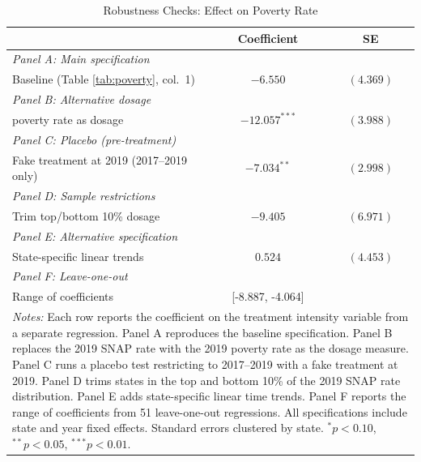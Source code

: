 \begin{table}[htbp]
\centering
\caption{Robustness Checks: Effect on Poverty Rate}
\label{tab:robustness}
\begin{tabular}{lcc}
\hline\hline
 & Coefficient & SE \\
\hline
\textit{Panel A: Main specification} & & \\
\quad Baseline (Table \ref{tab:poverty}, col.~1) & $-6.550$ & $(4.369)$ \\
[6pt]
\textit{Panel B: Alternative dosage} & & \\
\quad 2019 poverty rate as dosage & $-12.057^{***}$ & $(3.988)$ \\
[6pt]
\textit{Panel C: Placebo (pre-treatment)} & & \\
\quad Fake treatment at 2019 (2017--2019 only) & $-7.034^{**}$ & $(2.998)$ \\
[6pt]
\textit{Panel D: Sample restrictions} & & \\
\quad Trim top/bottom 10\% dosage & $-9.405$ & $(6.971)$ \\
[6pt]
\textit{Panel E: Alternative specification} & & \\
\quad State-specific linear trends & $0.524$ & $(4.453)$ \\
[6pt]
\textit{Panel F: Leave-one-out} & & \\
\quad Range of coefficients & [-8.887, -4.064] & \\
\hline\hline
\multicolumn{3}{p{0.8\textwidth}}{\footnotesize \textit{Notes:} Each row reports the coefficient on the treatment intensity variable from a separate regression. Panel A reproduces the baseline specification. Panel B replaces the 2019 SNAP rate with the 2019 poverty rate as the dosage measure. Panel C runs a placebo test restricting to 2017--2019 with a fake treatment at 2019. Panel D trims states in the top and bottom 10\% of the 2019 SNAP rate distribution. Panel E adds state-specific linear time trends. Panel F reports the range of coefficients from 51 leave-one-out regressions. All specifications include state and year fixed effects. Standard errors clustered by state. $^{*}p<0.10$, $^{**}p<0.05$, $^{***}p<0.01$.} \\
\end{tabular}
\end{table}
